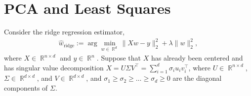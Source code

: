 \documentclass{article}
\newcommand{\Question}[1]{\Large \section{ #1 } \normalsize}
\DeclareMathOperator{\R}{\mathbb{R}}
\begin{document}
\newpage


\Question {PCA and Least Squares}


\newcommand{\hatwPCA}{\hat{ {w}}_\text{{PCA}}}
\newcommand{\rhoPCA}{\rho_k}
\newcommand{\hatwridge}{ \hat{{w}}_{\text{ridge}}}
\newcommand{\hatwOLS}{ \hat{{w}}_{\text{OLS}}}
\newcommand{\Sigk}{ {\Sigma}_k}
\newcommand{\wrp}{\widehat{  w}_{\mathrm{RP}}}

Consider the ridge regression estimator, 
\begin{align*}
\widehat{  w}_{\mathrm{ridge}} := \arg \min_{  w \in \R^d} \|  X   w -   y\|_2^2 + \lambda \|  w\|_2^2,
\end{align*}
where $X \in \R^{n \times d}$ and $y \in \R^n$. Suppose that $X$ has already been centered and has singular value decomposition $X = U \Sigma V^\top = \sum_{i=1}^d \sigma_i u_i v_i^\top$, where $U \in \R^{n \times d}$, $\Sigma \in \R^{d \times d}$, and $V \in \R^{d \times d}$, and $\sigma_1 \ge \sigma_2 \ge \dots \ge \sigma_d \ge 0$ are the diagonal components of $\Sigma$.
\end{document}
